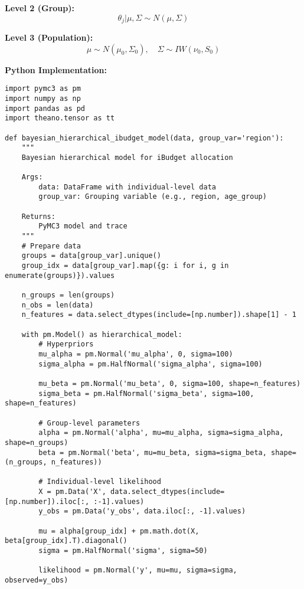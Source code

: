 \textbf{Level 2 (Group):}
\begin{equation}
\theta_j | \mu, \Sigma \sim N(\mu, \Sigma)
\end{equation}

\textbf{Level 3 (Population):}
\begin{equation}
\mu \sim N(\mu_0, \Sigma_0), \quad \Sigma \sim IW(\nu_0, S_0)
\end{equation}

\textbf{Python Implementation:}
\begin{lstlisting}
import pymc3 as pm
import numpy as np
import pandas as pd
import theano.tensor as tt

def bayesian_hierarchical_ibudget_model(data, group_var='region'):
    """
    Bayesian hierarchical model for iBudget allocation
    
    Args:
        data: DataFrame with individual-level data
        group_var: Grouping variable (e.g., region, age_group)
    
    Returns:
        PyMC3 model and trace
    """
    # Prepare data
    groups = data[group_var].unique()
    group_idx = data[group_var].map({g: i for i, g in enumerate(groups)}).values
    
    n_groups = len(groups)
    n_obs = len(data)
    n_features = data.select_dtypes(include=[np.number]).shape[1] - 1
    
    with pm.Model() as hierarchical_model:
        # Hyperpriors
        mu_alpha = pm.Normal('mu_alpha', 0, sigma=100)
        sigma_alpha = pm.HalfNormal('sigma_alpha', sigma=100)
        
        mu_beta = pm.Normal('mu_beta', 0, sigma=100, shape=n_features)
        sigma_beta = pm.HalfNormal('sigma_beta', sigma=100, shape=n_features)
        
        # Group-level parameters
        alpha = pm.Normal('alpha', mu=mu_alpha, sigma=sigma_alpha, shape=n_groups)
        beta = pm.Normal('beta', mu=mu_beta, sigma=sigma_beta, shape=(n_groups, n_features))
        
        # Individual-level likelihood
        X = pm.Data('X', data.select_dtypes(include=[np.number]).iloc[:, :-1].values)
        y_obs = pm.Data('y_obs', data.iloc[:, -1].values)
        
        mu = alpha[group_idx] + pm.math.dot(X, beta[group_idx].T).diagonal()
        sigma = pm.HalfNormal('sigma', sigma=50)
        
        likelihood = pm.Normal('y', mu=mu, sigma=sigma, observed=y_obs)
        

\end{lstlisting}
